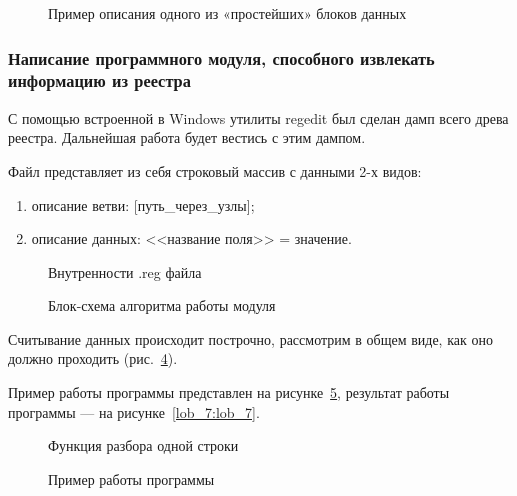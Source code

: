 \begin{figure}[h!]
\caption{Пример описания одного из «простейших» блоков данных}
\label{lob_2:lob_2}
\end{figure} 

\subsubsection{Написание программного модуля, способного извлекать информацию из реестра}

С помощью встроенной в Windows утилиты regedit был сделан дамп всего древа реестра. Дальнейшая работа будет вестись с этим дампом.

Файл представляет из себя строковый массив с данными 2-х видов:

\begin{enumerate}
  \item описание ветви: [путь\_через\_узлы];
  \item описание данных: <<название поля>> = значение.
\end{enumerate}



\begin{figure}[h!]
\caption{Внутренности .reg файла}
\label{lob_3:lob_3}
\end{figure} 

\begin{figure}[h!]
\caption{Блок-схема алгоритма работы модуля}
\label{lob_4:lob_4}
\end{figure} 

Считывание данных происходит построчно, рассмотрим в общем виде, как оно должно проходить (рис.~\ref{lob_5:lob_5}).

Пример работы программы представлен на рисунке~\ref{lob_6:lob_6}, результат работы программы --- на рисунке~\ref{lob_7:lob_7}.

\begin{figure}[h!]
\caption{Функция разбора одной строки}
\label{lob_5:lob_5}
\end{figure} 

\begin{figure}[h!]
\caption{Пример работы программы}
\label{lob_6:lob_6}
\end{figure} 


